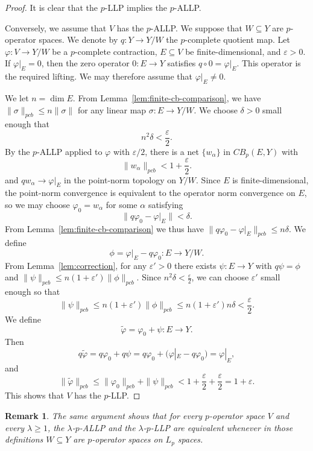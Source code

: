 \documentclass[12pt]{article}
\newtheorem{remark}[theorem]{Remark}
\newcommand{\pcb}{pcb}
\newcommand{\CBp}{CB_p}
\begin{document}
\begin{proof}
It is clear that the $p$-LLP implies the $p$-ALLP.

Conversely, we assume that $V$ has the $p$-ALLP.  We suppose that $W\subseteq Y$ are $p$-operator spaces. We denote by $q:Y\to Y/W$ the $p$-complete quotient map.  Let $\varphi:V\to Y/W$ be a $p$-complete contraction, $E\subseteq V$ be finite-dimensional, and $\varepsilon>0$.  If $\varphi|_E=0$, then the zero operator $0:E\to Y$ satisfies $q\circ 0=\varphi|_E$. This operator is the required lifting.  We may therefore assume that $\varphi|_E\neq 0$.

We let $n=\dim E$.  From Lemma~\ref{lem:finite-cb-comparison}, we have
$\|\sigma\|_{\pcb}\leq n\|\sigma\|$ for any linear map $\sigma:E\to Y/W$.
We choose $\delta>0$ small enough that
\[
        n^{2}\delta<\frac{\varepsilon}{2}.
\]
By the $p$-ALLP applied to $\varphi$ with $\varepsilon/2$, there
is a net $\{w_\alpha\}$ in $\CBp(E,Y)$ with
\[
        \|w_\alpha\|_{\pcb}<1+\frac{\varepsilon}{2}.
\]
and $qw_\alpha\to \varphi|_E$ in the point-norm topology on $Y/W$.  Since $E$ is
finite-dimensional, the point-norm convergence is equivalent to the operator norm
convergence on $E$, so we may choose $\varphi_0=w_\alpha$ for some $\alpha$ satisfying
\[
        \|q\varphi_0-\varphi|_E\|<\delta.
\]
From Lemma~\ref{lem:finite-cb-comparison} we thus have
$\|q\varphi_0-\varphi|_E\|_{\pcb}\leq n\delta$.  We define
\[
        \phi=\varphi|_E-q\varphi_0:E\to Y/W.
\]
From Lemma~\ref{lem:correction}, for any $\varepsilon'>0$ there exists $\psi:E\to Y$ with $q\psi=\phi$ and $\|\psi\|_{\pcb}\leq n(1+\varepsilon')\|\phi\|_{\pcb}$. Since $n^{2}\delta<\frac{\varepsilon}{2}$, we can choose $\varepsilon'$ small enough so that
\[
        \|\psi\|_{\pcb}\leq n(1+\varepsilon')\|\phi\|_{\pcb}\leq n(1+\varepsilon')n\delta <\frac{\varepsilon}{2}.
\]
We define
\[
        \widetilde{\varphi}=\varphi_0+\psi:E\to Y.
\]
Then
\[
        q\widetilde{\varphi}=q\varphi_0+q\psi=q\varphi_0+(\varphi|_E-q\varphi_0)=\varphi|_E,
\]
and
\[
        \|\widetilde{\varphi}\|_{\pcb}
        \leq \|\varphi_0\|_{\pcb}+\|\psi\|_{\pcb}
        <1+\frac{\varepsilon}{2}+\frac{\varepsilon}{2}=1+\varepsilon.
\]
This shows that $V$ has the $p$-LLP.
\end{proof}

\begin{remark}\label{rem:main-on-Lp}
The same argument shows that for every $p$-operator space $V$ and every
$\lambda\geq 1$, the $\lambda$-$p$-ALLP and the $\lambda$-$p$-LLP are equivalent
whenever in those definitions $W\subseteq Y$ are $p$-operator spaces on $L_p$ spaces.
\end{remark}
\end{document}
